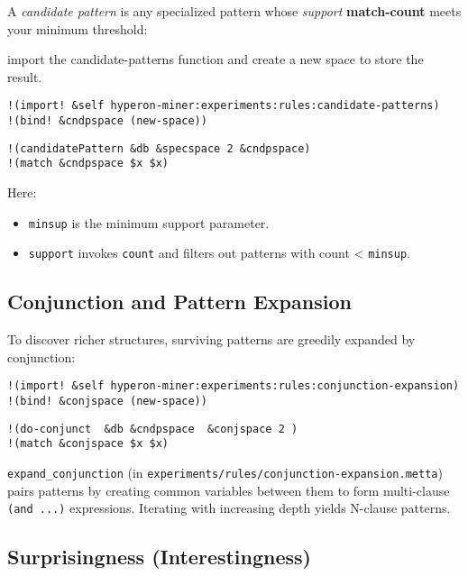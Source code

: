 \documentclass{article}
\begin{document}
A \emph{candidate pattern} is any specialized pattern whose \emph{support}  \textbf{match-count} meets your minimum threshold:

import the candidate-patterns function and create a new space to store the result.

 \begin{verbatim}
!(import! &self hyperon-miner:experiments:rules:candidate-patterns)
!(bind! &cndpspace (new-space))
  \end{verbatim}

\begin{verbatim}
!(candidatePattern &db &specspace 2 &cndpspace)
!(match &cndpspace $x $x)
\end{verbatim}

Here:\\

\begin{itemize}
  \item \texttt{minsup} is the minimum support parameter.
  \item \texttt{support} invokes \texttt{count} and filters out patterns with count < \texttt{minsup}.
\end{itemize}

\subsection{Conjunction and Pattern Expansion}

To discover richer structures, surviving patterns are greedily expanded by conjunction:

 \begin{verbatim}
!(import! &self hyperon-miner:experiments:rules:conjunction-expansion)
!(bind! &conjspace (new-space))
  \end{verbatim}

\begin{verbatim}
!(do-conjunct  &db &cndpspace  &conjspace 2 )
!(match &conjspace $x $x)
\end{verbatim}

\texttt{expand_conjunction} (in \texttt{experiments/rules/conjunction-expansion.metta}) pairs patterns by creating common variables between them to form multi-clause \verb|(and ...)| expressions.  Iterating with increasing depth yields N-clause patterns.

\subsection{Surprisingness (Interestingness)}
\end{document}

